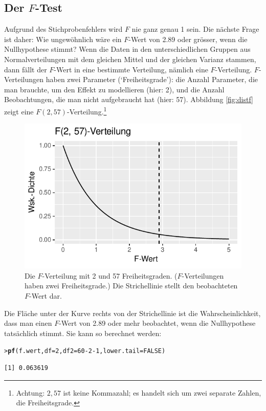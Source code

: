 \documentclass[oneside, 10pt]{book}\usepackage[]{graphicx}\usepackage[]{xcolor}
\makeatletter
\newcommand{\hlnum}[1]{\textcolor[rgb]{0.686,0.059,0.569}{#1}}%
\newcommand{\hlopt}[1]{\textcolor[rgb]{0,0,0}{#1}}%
\newcommand{\hlstd}[1]{\textcolor[rgb]{0.345,0.345,0.345}{#1}}%
\newcommand{\hlkwc}[1]{\textcolor[rgb]{0.333,0.667,0.333}{#1}}%
\newcommand{\hlkwd}[1]{\textcolor[rgb]{0.737,0.353,0.396}{\textbf{#1}}}%
\newenvironment{kframe}{%
 \def\at@end@of@kframe{}%
 \ifinner\ifhmode%
  \def\at@end@of@kframe{\end{minipage}}%
  \begin{minipage}{\columnwidth}%
 \fi\fi%
 \def\FrameCommand##1{\hskip\@totalleftmargin \hskip-\fboxsep
 \colorbox{shadecolor}{##1}\hskip-\fboxsep
     \hskip-\linewidth \hskip-\@totalleftmargin \hskip\columnwidth}%
 \MakeFramed {\advance\hsize-\width
   \@totalleftmargin\z@ \linewidth\hsize
   \@setminipage}}%
 {\par\unskip\endMakeFramed%
 \at@end@of@kframe}
\newenvironment{knitrout}{}{} %
\makeatother
\begin{document}
\subsection{Der $F$-Test}
Aufgrund des Stichprobenfehlers wird $F$ nie ganz genau 1 sein.
Die nächste Frage ist daher: Wie ungewöhnlich wäre ein $F$-Wert von 2.89 oder grösser,
wenn die Nullhypothese stimmt?
Wenn die Daten in den unterschiedlichen
Gruppen aus Normalverteilungen
mit dem gleichen Mittel und der gleichen Varianz stammen,
dann fällt der $F$-Wert in eine bestimmte Verteilung, nämlich eine $F$-Verteilung.
$F$-Verteilungen haben zwei Parameter (`Freiheitsgrade'):
die Anzahl Parameter, die man brauchte, um den Effekt zu modellieren (hier: 2),
und die Anzahl Beobachtungen, die man nicht aufgebraucht hat (hier: 57).
Abbildung \ref{fig:distf} zeigt eine $F(2, 57)$-Verteilung.\footnote{Achtung: $2, 57$ ist keine Kommazahl; es handelt sich um zwei separate Zahlen, die Freiheitsgrade.}
\begin{knitrout}
\color{fgcolor}\begin{figure}[tp]

{\centering \includegraphics[width=.5\textwidth]{figs/unnamed-chunk-394-1} 

}

\caption{Die $F$-Verteilung mit 2 und 57 Freiheitsgraden. ($F$-Verteilungen haben zwei Freiheitsgrade.) Die Strichellinie stellt den beobachteten $F$-Wert dar.\label{fig:distf}}\label{fig:unnamed-chunk-394}
\end{figure}

\end{knitrout}

Die Fläche unter der Kurve rechts von der Strichellinie
ist die Wahrscheinlichkeit, dass man einen $F$-Wert von
2.89 oder mehr beobachtet, wenn die Nullhypothese tatsächlich stimmt.
Sie kann so berechnet werden:
\begin{knitrout}
\color{fgcolor}\begin{kframe}
\begin{alltt}
\hlstd{> }\hlkwd{pf}\hlstd{(f.wert,} \hlkwc{df} \hlstd{=} \hlnum{2}\hlstd{,} \hlkwc{df2} \hlstd{=} \hlnum{60} \hlopt{-} \hlnum{2} \hlopt{-} \hlnum{1}\hlstd{,} \hlkwc{lower.tail} \hlstd{=} \hlnum{FALSE}\hlstd{)}
\end{alltt}
\begin{verbatim}
[1] 0.063619
\end{verbatim}
\end{kframe}
\end{knitrout}
\end{document}

